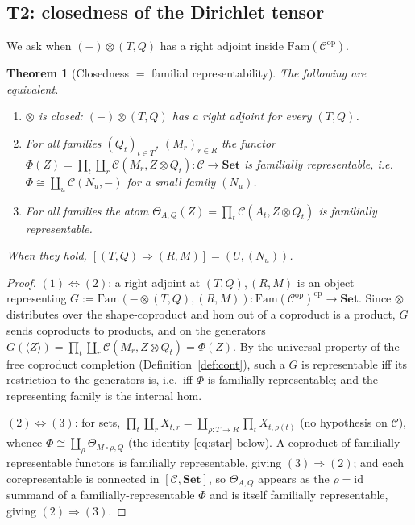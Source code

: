 \documentclass[11pt]{amsart}
\theoremstyle{plain}
\newtheorem{theorem}{Theorem}[section]
\theoremstyle{definition}
\theoremstyle{remark}
\newcommand{\C}{\mathcal{C}}
\newcommand{\Set}{\mathbf{Set}}
\newcommand{\Fam}{\mathrm{Fam}}
\newcommand{\op}{\mathrm{op}}
\newcommand{\id}{\mathrm{id}}
\newcommand{\coprodd}{\textstyle\coprod}
\newcommand{\prodd}{\textstyle\prod}
\begin{document}
\subsection{T2: closedness of the Dirichlet tensor}\label{ss:T2}

We ask when $(-)\otimes(T,Q)$ has a right adjoint inside $\Fam(\C^\op)$.

\begin{theorem}[Closedness $=$ familial representability]\label{thm:T2}
The following are equivalent.
\begin{enumerate}
\item $\otimes$ is closed: $(-)\otimes(T,Q)$ has a right adjoint for every $(T,Q)$.
\item For all families $(Q_t)_{t\in T}$, $(M_r)_{r\in R}$ the functor
$\Phi(Z)=\prodd_{t}\coprodd_{r}\C(M_r,Z\otimes Q_t)\colon\C\to\Set$ is familially representable, i.e.\
$\Phi\cong\coprodd_u\C(N_u,-)$ for a small family $(N_u)$.
\item For all families the atom $\Theta_{A,Q}(Z)=\prodd_{t}\C(A_t,Z\otimes Q_t)$ is familially
representable.
\end{enumerate}
When they hold, $[(T,Q)\Rightarrow(R,M)]=(U,(N_u))$.
\end{theorem}
\begin{proof}
$(1)\Leftrightarrow(2)$: a right adjoint at $(T,Q),(R,M)$ is an object representing
$G:=\Fam(-\otimes(T,Q),(R,M))\colon\Fam(\C^\op)^\op\to\Set$. Since $\otimes$ distributes over the
shape-coproduct and hom out of a coproduct is a product, $G$ sends coproducts to products, and on the
generators $G(\langle Z\rangle)=\prodd_t\coprodd_r\C(M_r,Z\otimes Q_t)=\Phi(Z)$. By the universal
property of the free coproduct completion (Definition~\ref{def:cont}), such a $G$ is representable
iff its restriction to the generators is, i.e.\ iff $\Phi$ is familially representable; and the
representing family is the internal hom.

$(2)\Leftrightarrow(3)$: for sets, $\prodd_t\coprodd_r X_{t,r}=\coprodd_{\rho\colon T\to R}\prodd_t
X_{t,\rho(t)}$ (no hypothesis on $\C$), whence $\Phi\cong\coprodd_\rho\Theta_{M\circ\rho,Q}$ (the
identity \eqref{eq:star} below). A coproduct of familially representable functors is familially
representable, giving $(3)\Rightarrow(2)$; and each corepresentable is connected in $[\C,\Set]$, so
$\Theta_{A,Q}$ appears as the $\rho=\id$ summand of a familially-representable $\Phi$ and is itself
familially representable, giving $(2)\Rightarrow(3)$.
\end{proof}
\end{document}
